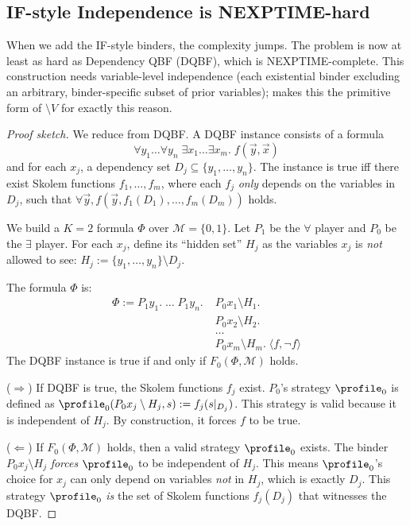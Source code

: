 \subsection{IF-style Independence is NEXPTIME-hard}

When we add the IF-style binders, the complexity jumps.
The problem is now at least as hard as Dependency QBF (DQBF),
which is NEXPTIME-complete. This construction needs variable-level
independence (each existential binder excluding an arbitrary,
binder-specific subset of prior variables);  makes
this the primitive form of $\setminus V$ for exactly this reason.


\begin{proof}[Proof sketch]
We reduce from DQBF. A DQBF instance consists of a formula
\[
  \forall y_1 \dots \forall y_n \; \exists x_1 \dots \exists x_m.\; f(\vec{y}, \vec{x})
\]
and for each $x_j$, a dependency set $D_j \subseteq \{y_1, \dots, y_n\}$.
The instance is true iff there exist Skolem functions $f_1, \dots, f_m$,
where each $f_j$ \emph{only} depends on the variables in $D_j$,
such that $\forall \vec{y}, f(\vec{y}, f_1(D_1), \dots, f_m(D_m))$ holds.

We build a $K=2$ formula $\Phi$ over $\mathcal{M}=\{0,1\}$.
Let $P_1$ be the $\forall$ player and $P_0$ be the $\exists$ player.
For each $x_j$, define its ``hidden set'' $H_j$ as the
variables $x_j$ is \emph{not} allowed to see:
$H_j := \{y_1, \dots, y_n\} \setminus D_j$.

The formula $\Phi$ is:
\[
\begin{aligned}
\Phi :=
  P_1 y_1.\; \dots\; P_1 y_n.\;
  & P_0 x_1 \setminus H_1.\; \\
  & P_0 x_2 \setminus H_2.\; \\
  & \dots \\
  & P_0 x_m \setminus H_m.\;
  \langle f, \neg f \rangle
\end{aligned}
\]
The DQBF instance is true if and only if $F_0(\Phi, \mathcal{M})$ holds.

($\Rightarrow$) If DQBF is true, the Skolem functions $f_j$ exist.
$P_0$'s strategy $\profile_0$ is defined as $\profile_0(P_0 x_j \setminus H_j, s) := f_j(s|_{D_j})$.
This strategy is valid because it is independent of $H_j$.
By construction, it forces $f$ to be true.

($\Leftarrow$) If $F_0(\Phi, \mathcal{M})$ holds, then a valid strategy
$\profile_0$ exists. The binder $P_0 x_j \setminus H_j$
\emph{forces} $\profile_0$ to be independent of $H_j$.
This means $\profile_0$'s choice for $x_j$ can only depend on
variables \emph{not} in $H_j$, which is exactly $D_j$.
This strategy $\profile_0$ \emph{is} the set of
Skolem functions $f_j(D_j)$ that witnesses the DQBF.
\end{proof}

